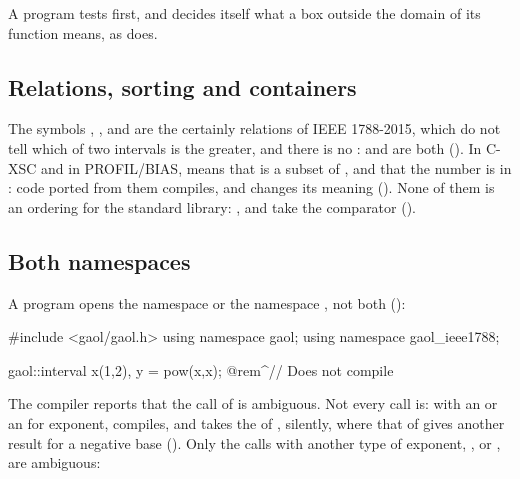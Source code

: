\documentclass[12pt,a4paper,twoside,openright]{book}
\begin{document}
\noindent
A program tests  first, and decides itself what a box
outside the domain of its function means, as 
does.\newinvfive

\subsection{Relations, sorting and containers}
%

The symbols \code{<}, \code{<=}, \code{>} and \code{>=} are the certainly
relations of IEEE 1788-2015, which do not tell which of two intervals is the
greater, and there is no \code{==}:  and
 are both 
(). In C-XSC and in PROFIL/BIAS, 
means that  is a subset of , and  that the number
 is in : code ported from them compiles, and changes its
meaning (). None of them is an ordering for the
standard library: ,  and  take
the comparator 
().\newinvfive

\subsection{Both namespaces}

A program opens the namespace  or the namespace
, not both ():

\begin{example}
#include <gaol/gaol.h>
using namespace gaol;
using namespace gaol_ieee1788;

gaol::interval x(1,2), y = pow(x,x); @rem^// Does not compile~
\end{example}

\noindent
The compiler reports that the call of  is ambiguous. Not every call
is: with an  or an  for exponent, 
compiles, and takes the  of , silently, where that of
 gives another result for a negative base
(). Only the calls with another type of exponent,
,  or , are
ambiguous:\newinvfive
\end{document}
